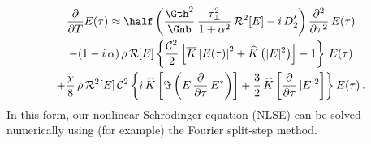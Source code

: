 \begin{multline} \label{eqn:mflt_nlse}
    \frac{\partial}{\partial T}  E(\tau) \approx \half \left( \frac{\Gth^2}{\Gnb}\, \frac{\tau_\perp^2}{1 + \alpha^2}\, \mathcal{R}^2[E] - i\, D_2^\prime \right) \frac{\partial^2}{\partial \tau^2}\, E(\tau) \\
    - (1 - i\, \alpha)\, \rho\,  \mathcal{R}[E] \left\{\frac{\mathcal{C}^2}{2} \left[\overline{K} \left|E(\tau)\right|^2 + \widehat{K}\left(|E|^2\right)\right] - 1\right\}\, E(\tau) \\
    + \frac{\chi}{8}\, \rho\, \mathcal{R}^2[E]\, \mathcal{C}^2 \left\{i\, \widehat{K}\left[\Im\left(E\,\frac{\partial}{\partial \tau}\, E^\ast\right)\right] + \frac{3}{2}\,\widehat{K} \left[\frac{\partial}{\partial \tau}\, |E|^2\right]\right\} E(\tau)\, .
\end{multline}
In this form, our nonlinear Schr{\"o}dinger equation (NLSE) can be solved numerically using (for example) the Fourier split-step method.

